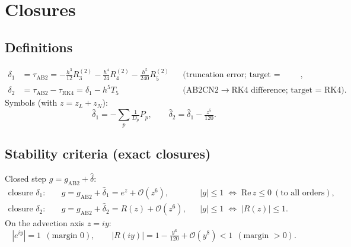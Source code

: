 \documentclass[11pt]{article}
\newcommand{\bO}{\mathcal{O}}
\newcommand{\zL}{z_L}
\newcommand{\zN}{z_N}
\begin{document}
\section{Closures}

\subsection{Definitions}
\begin{align}
  \delta_1 &= \tau_{\mathrm{AB2}} = -\tfrac{h^3}{12}R_3^{(2)}-\tfrac{h^4}{24}R_4^{(2)}-\tfrac{h^5}{240}R_5^{(2)}
    && \text{(truncation error; target = exact flow)},\\
  \delta_2 &= \tau_{\mathrm{AB2}}-\tau_{\mathrm{RK4}}
    = \delta_1 - h^5 T_5
    && \text{(AB2CN2}\!\to\!\text{RK4 difference; target = RK4)}.
\end{align}
Symbols (with $z=\zL+\zN$):
\begin{equation}
  \hat\delta_1 = -\sum_p\tfrac{1}{D_p}P_p,\qquad
  \hat\delta_2 = \hat\delta_1 - \tfrac{z^5}{120}.
  \label{eq:dhat}
\end{equation}

\subsection{Stability criteria (exact closures)}
Closed step $g = g_{\mathrm{AB2}}+\hat\delta$:
\begin{align}
  \text{closure }\delta_1:\quad & g = g_{\mathrm{AB2}}+\hat\delta_1 = e^{z}+\bO(z^6),
    && |g|\le1 \;\Leftrightarrow\; \mathrm{Re}\,z\le0\ (\text{to all orders}),\\
  \text{closure }\delta_2:\quad & g = g_{\mathrm{AB2}}+\hat\delta_2 = R(z)+\bO(z^6),
    && |g|\le1 \;\Leftrightarrow\; |R(z)|\le1.
\end{align}
On the advection axis $z=iy$:
\begin{equation}
  |e^{iy}| = 1\ \ (\text{margin }0),
  \qquad
  |R(iy)| = 1-\tfrac{y^6}{120}+\bO(y^8) < 1\ \ (\text{margin }>0).
  \label{eq:axis-margins}
\end{equation}

\end{document}
